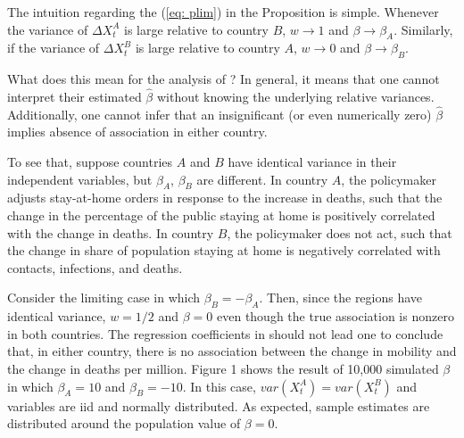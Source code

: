 \documentclass{article}
\theoremstyle{lemma}
\begin{document}
The intuition regarding the (\ref{eq: plim}) in the Proposition is simple. Whenever the variance of $\Delta X_t^A$ is large relative to country $B$, $w \to 1$ and $\beta \to \beta_A$. Similarly, if the variance of $\Delta X_t^B$ is large relative to country $A$, $w \to 0$ and $\beta \to \beta_B$.

What does this mean for the analysis of \textcite{savaris_stay-at-home_2021}? In general, it means that one cannot interpret their estimated $\hat{\beta}$ without knowing the underlying relative variances. Additionally, one cannot infer that an insignificant (or even numerically zero) $\hat{\beta}$ implies absence of association in either country.

To see that, suppose countries $A$ and $B$ have identical variance in their independent variables, but $\beta_A$, $\beta_B$ are different. In country $A$, the policymaker adjusts stay-at-home orders in response to the increase in deaths, such that the change in the percentage of the public staying at home is positively correlated with the change in deaths. In country $B$, the policymaker does not act, such that the change in share of population staying at home is negatively correlated with contacts, infections, and deaths.

Consider the limiting case in which $\beta_B = - \beta_A$. Then, since the regions have identical variance, $w=1/2$ and $\beta = 0$ even though the true association is nonzero in both countries. The regression coefficients in \textcite{savaris_stay-at-home_2021} should not lead one to conclude that, in either country, there is no association between the change in mobility and the change in deaths per million. Figure 1 shows the result of 10,000 simulated $\beta$ in which $\beta_A = 10$ and $\beta_B = -10$. In this case, $var(X^A_t) = var(X^B_t)$ and variables are iid and normally distributed. As expected, sample estimates are distributed around the population value of $\beta=0$.
\end{document}
